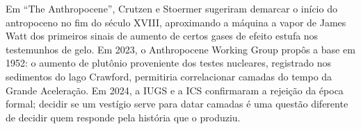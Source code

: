 Em \enquote{The Anthropocene}, Crutzen e Stoermer sugeriram demarcar o início do antropoceno no fim do século XVIII, aproximando a máquina a vapor de James Watt dos primeiros sinais de aumento de certos gases de efeito estufa nos testemunhos de gelo. Em 2023, o Anthropocene Working Group propôs a base em 1952: o aumento de plutônio proveniente dos testes nucleares, registrado nos sedimentos do lago Crawford, permitiria correlacionar camadas do tempo da Grande Aceleração. Em 2024, a IUGS e a ICS confirmaram a rejeição da época formal; decidir se um vestígio serve para datar camadas é uma questão diferente de decidir quem responde pela história que o produziu.

